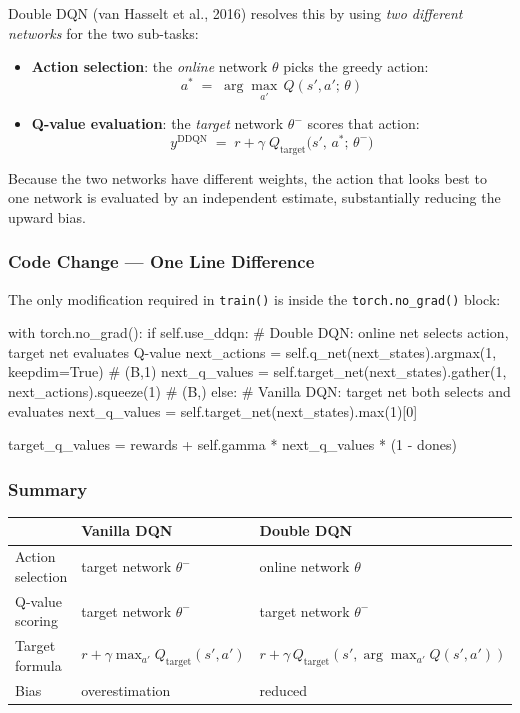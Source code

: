 \documentclass[12pt,a4paper]{report}
\begin{document}
Double DQN (van Hasselt et al., 2016) resolves this by using \emph{two different networks}
for the two sub-tasks:

\begin{itemize}[leftmargin=1.8em]
  \item \textbf{Action selection}: the \emph{online} network $\theta$ picks the greedy action:
  \[
    a^* \;=\; \arg\max_{a'}\, Q(s', a';\,\theta)
  \]
  \item \textbf{Q-value evaluation}: the \emph{target} network $\theta^-$ scores that action:
  \[
    y^{\text{DDQN}} \;=\; r + \gamma\; Q_{\text{target}}\!\bigl(s',\, a^*;\,\theta^-\bigr)
  \]
\end{itemize}

Because the two networks have different weights, the action that looks best to one network
is evaluated by an independent estimate, substantially reducing the upward bias.

\subsubsection*{Code Change — One Line Difference}

The only modification required in \texttt{train()} is inside the \texttt{torch.no\_grad()} block:

\begin{pycode}
with torch.no_grad():
    if self.use_ddqn:
        # Double DQN: online net selects action, target net evaluates Q-value
        next_actions  = self.q_net(next_states).argmax(1, keepdim=True)      # (B,1)
        next_q_values = self.target_net(next_states).gather(1, next_actions).squeeze(1)  # (B,)
    else:
        # Vanilla DQN: target net both selects and evaluates
        next_q_values = self.target_net(next_states).max(1)[0]

    target_q_values = rewards + self.gamma * next_q_values * (1 - dones)
\end{pycode}

\subsubsection*{Summary}

\begin{center}
{\setlength{\tabcolsep}{14pt}
\begin{tabular}{lll}
\toprule
 & \textbf{Vanilla DQN} & \textbf{Double DQN} \\
\midrule
Action selection & target network $\theta^-$ & online network $\theta$ \\
Q-value scoring  & target network $\theta^-$ & target network $\theta^-$ \\
Target formula   & $r + \gamma\max_{a'} Q_{\text{target}}(s',a')$ & $r + \gamma\, Q_{\text{target}}(s', \arg\max_{a'}Q(s',a'))$ \\
Bias             & overestimation            & reduced \\
\bottomrule
\end{tabular}}
\end{center}
\end{document}
